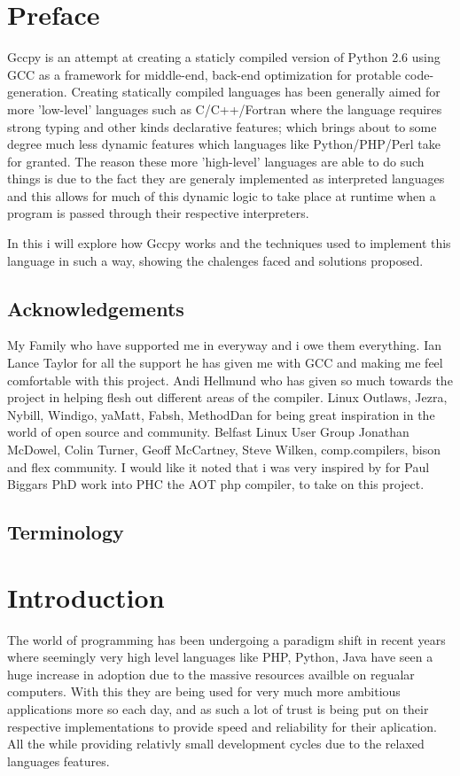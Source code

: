 \documentclass[defaultstyle,11pt]{article}
\begin{document}
\section{Preface}
Gccpy is an attempt at creating a staticly compiled version of Python 2.6 using GCC as a framework for
middle-end, back-end optimization for protable code-generation. Creating statically compiled languages has
been generally aimed for more 'low-level' languages such as C/C++/Fortran where the language requires
strong typing and other kinds declarative features; which brings about to some degree much less dynamic
features which languages like Python/PHP/Perl take for granted. The reason these more 'high-level' 
languages are able to do such things is due to the fact they are generaly implemented as interpreted
languages and this allows for much of this dynamic logic to take place at runtime when a program is passed
through their respective interpreters.

In this i will explore how Gccpy works and the techniques used to implement this language in such a way,
showing the chalenges faced and solutions proposed.

\subsection{Acknowledgements}
My Family who have supported me in everyway and i owe them everything. Ian Lance Taylor for all the support
he has given me with GCC and making me feel comfortable with this project. Andi Hellmund who
has given so much towards the project in helping flesh out different areas of the compiler.
Linux Outlaws, Jezra, Nybill, Windigo, yaMatt, Fabsh, MethodDan for being great inspiration in the world
of open source and community. Belfast Linux User Group Jonathan McDowel,
Colin Turner, Geoff McCartney, Steve Wilken, comp.compilers, bison and flex community. 
I would like it noted that i was very inspired by for Paul Biggars PhD work into PHC the AOT php compiler,
to take on this project.

\subsection{Terminology}

\section{Introduction}

The world of programming has been undergoing a paradigm shift in recent years where seemingly very high level
languages like PHP, Python, Java have seen a huge increase in adoption due to the massive resources availble on
regualar computers. With this they are being used for very much more ambitious applications more so each day,
and as such a lot of trust is being put on their respective implementations to provide speed and reliability for
their aplication. All the while providing relativly small development cycles due to the relaxed languages features.
\end{document}
